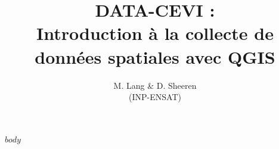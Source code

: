 \documentclass[12]{scrartcl}
\begin{document}
\title{DATA-CEVI :\\ Introduction à la collecte de données spatiales avec QGIS}
\date{}
\author{M. Lang \& D. Sheeren \\(INP-ENSAT)}
\maketitle
\tableofcontents
\pagebreak

$body$
\end{document}
